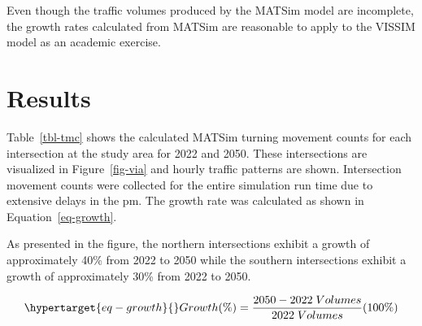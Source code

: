 \documentclass[
  letterpaper,
  DIV=11,
  numbers=noendperiod]{scrartcl}
\begin{document}
Even though the traffic volumes produced by the MATSim model are
incomplete, the growth rates calculated from MATSim are reasonable to
apply to the VISSIM model as an academic exercise.

\hypertarget{results}{%
\section{Results}\label{results}}

Table~\ref{tbl-tmc} shows the calculated MATSim turning movement counts
for each intersection at the study area for 2022 and 2050. These
intersections are visualized in Figure~\ref{fig-via} and hourly traffic
patterns are shown. Intersection movement counts were collected for the
entire simulation run time due to extensive delays in the pm. The growth
rate was calculated as shown in Equation~\ref{eq-growth}.

As presented in the figure, the northern intersections exhibit a growth
of approximately 40\% from 2022 to 2050 while the southern intersections
exhibit a growth of approximately 30\% from 2022 to 2050.

\begin{equation}\protect\hypertarget{eq-growth}{}{
Growth(\%)=\frac{2050-2022 \; Volumes}{2022 \; Volumes}(100\%)
}\label{eq-growth}\end{equation}
\end{document}
